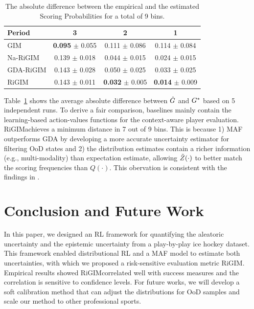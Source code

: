 \documentclass{article}
\newcommand{\sys}{RiGIM}
\newcommand{\goal}{g}
\newcommand{\system}{\sys\;}
\begin{document}
\begin{table}[htbp]
{\begin{tabular}{l|ccc}
Period & 3 & 2 & 1 \\\hline
GIM & {\bf 0.095} $\pm$ 0.055 & 0.111 $\pm$ 0.086 & 0.114 $\pm$ 0.084\\
Na-RiGIM  & 0.139 $\pm$ 0.018 & 0.044 $\pm$ 0.015 & 0.024 $\pm$ 0.015 \\
GDA-RiGIM & 0.143 $\pm$ 0.028 & 0.050 $\pm$ 0.025 & 0.033 $\pm$ 0.025  \\
RiGIM & 0.143 $\pm$ 0.011 & {\bf 0.032} $\pm$ 0.005 & {\bf 0.014} $\pm$ 0.009 \\ \bottomrule
\end{tabular}
}
\vspace{-0.1in}
\caption{The absolute difference between the empirical and the estimated Scoring Probabilities for a total of 9 bins.}
\label{table:calibration-results}
\end{table}

Table~\ref{table:calibration-results} shows the average absolute difference between $\hat{\MakeUppercase{\goal}}$ and $\MakeUppercase{\goal}^{*}$ based on 5 independent runs. To derive a fair comparison, baselines mainly contain the learning-based action-values functions for the context-aware player evaluation. \system achieves a minimum distance in 7 out of 9 bins. This is because 1) MAF outperforms GDA by developing a more accurate uncertainty estimator for filtering OoD states and 2) the distribution estimates contain a richer information (e.g., multi-modality) than expectation estimate, allowing $\Tilde{Z}(\cdot)$ to better match the scoring frequencies than $Q(\cdot)$. This obervation is consistent with the findings in \cite{bellemare2017distributional}.

\section{Conclusion and Future Work}

In this paper, we designed an RL framework for quantifying the aleatoric uncertainty and the epistemic uncertainty from a play-by-play ice hockey dataset. This framework enabled distributional RL and a MAF model to estimate both uncertainties, with which we proposed a risk-sensitive evaluation metric \system. Empirical results showed \system correlated well with success measures and the correlation is sensitive to confidence levels. For future works, we will develop a soft calibration method that can adjust the distributions for OoD samples and scale our method to other professional sports.
\end{document}
